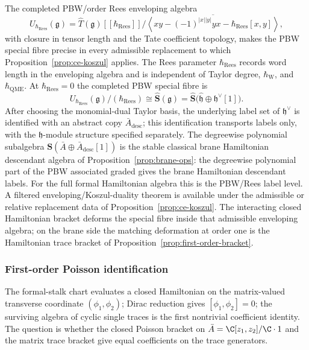 \documentclass[11pt]{memoir}
\begin{document}
The completed PBW/order Rees enveloping algebra
$$U_{\hbar_{\mathrm{Rees}}}(\mathfrak g)
  =\widehat T(\mathfrak g)[[\hbar_{\mathrm{Rees}}]]\Big/
  \overline{\left\langle
  xy-(-1)^{|x||y|}yx-\hbar_{\mathrm{Rees}}[x,y]\right\rangle},$$
with closure in tensor length and the Tate coefficient topology, makes
the PBW special fibre precise in every admissible
replacement to which Proposition~\ref{prop:ce-koszul} applies. The Rees
parameter \(\hbar_{\mathrm{Rees}}\) records word length in the enveloping algebra and is
independent of Taylor degree, \(\hbar_{\mathrm{W}}\), and
\(\hbar_{\mathrm{QME}}\). At \(\hbar_{\mathrm{Rees}}=0\) the completed PBW special
fibre is
$$U_{\hbar_{\mathrm{Rees}}}(\mathfrak g)/(\hbar_{\mathrm{Rees}})\cong
  \widehat{\mathbf{S}}(\mathfrak g)
  =\widehat{\mathbf{S}}\bigl(\widehat{\mathfrak h}\oplus\mathfrak h^\vee[1]\bigr).$$
After choosing the monomial-dual Taylor basis, the underlying label set
of \(\mathfrak h^\vee\) is identified with an abstract copy
\(\bar A_{\mathrm{desc}}\); this identification transports labels only,
with the \(\mathfrak h\)-module structure specified separately. The degreewise polynomial subalgebra
$\mathbf{S}(\bar A\oplus\bar A_{\mathrm{desc}}[1])$ is the stable
classical brane Hamiltonian descendant algebra of
Proposition~\ref{prop:brane-ops}: the degreewise polynomial part of the
PBW associated graded gives the brane Hamiltonian descendant labels. For
the full formal Hamiltonian algebra this is the PBW/Rees label level.
A filtered enveloping/Koszul-duality theorem is available under
the admissible or relative replacement data of
Proposition~\ref{prop:ce-koszul}. The interacting closed
Hamiltonian bracket deforms the special fibre inside that admissible
enveloping algebra; on the brane side the matching deformation at order
one is the Hamiltonian trace bracket of
Proposition~\ref{prop:first-order-bracket}.

\subsubsection{First-order Poisson identification}

The formal-stalk chart evaluates a closed Hamiltonian on the matrix-valued
transverse coordinate \((\phi_1,\phi_2)\); Dirac reduction gives
\([\phi_1,\phi_2]=0\); the surviving algebra of cyclic single traces
is the first nontrivial coefficient identity.  The question is whether the closed
Poisson bracket on \(\bar A=\C[z_1,z_2]/\C\cdot1\) and the matrix
trace bracket give equal coefficients on the trace generators.
\end{document}
